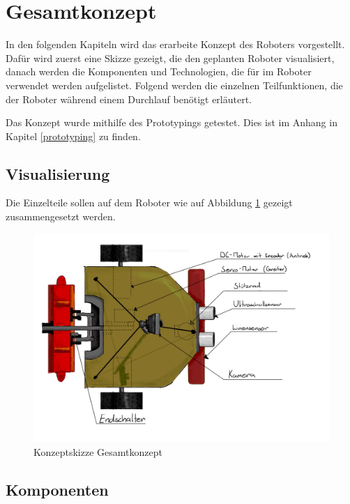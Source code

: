 \section{Gesamtkonzept}

In den folgenden Kapiteln wird das erarbeite Konzept des Roboters vorgestellt. Dafür wird zuerst eine Skizze gezeigt, die den geplanten Roboter visualisiert, danach werden die Komponenten und Technologien, die für im Roboter verwendet werden aufgelistet. Folgend werden die einzelnen Teilfunktionen, die der Roboter während einem Durchlauf benötigt erläutert. 

Das Konzept wurde mithilfe des Prototypings getestet. Dies ist im Anhang in Kapitel \ref{prototyping} zu finden.

\subsection{Visualisierung}

Die Einzelteile sollen auf dem Roboter wie auf Abbildung \ref{fig:robot_concept-scetch_labeld} gezeigt zusammengesetzt werden.

\begin{figure}[H]
\centering
\includegraphics[width=\textwidth]{assets/gesamtkonzept/Skizze-Fahrzeugkonzept-Beschriftet.jpg}
\caption{Konzeptskizze Gesamtkonzept}
\label{fig:robot_concept-scetch_labeld}
\end{figure}


\subsection{Komponenten}

